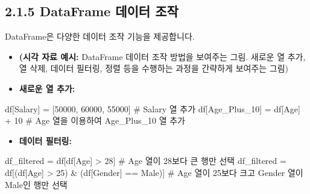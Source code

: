 \documentclass[
  letterpaper,
]{book}
\newenvironment{Shaded}{\begin{snugshade}}{\end{snugshade}}
\newcommand{\CommentTok}[1]{\textcolor[rgb]{0.37,0.37,0.37}{#1}}
\newcommand{\DecValTok}[1]{\textcolor[rgb]{0.68,0.00,0.00}{#1}}
\newcommand{\NormalTok}[1]{\textcolor[rgb]{0.00,0.23,0.31}{#1}}
\newcommand{\OperatorTok}[1]{\textcolor[rgb]{0.37,0.37,0.37}{#1}}
\newcommand{\StringTok}[1]{\textcolor[rgb]{0.13,0.47,0.30}{#1}}
\providecommand{\tightlist}{%
  \setlength{\itemsep}{0pt}\setlength{\parskip}{0pt}}
\begin{document}
\subsection{2.1.5 DataFrame 데이터
조작}\label{dataframe-uxb370uxc774uxd130-uxc870uxc791}

DataFrame은 다양한 데이터 조작 기능을 제공합니다.

\begin{itemize}
\item
  \textbf{(시각 자료 예시:} DataFrame 데이터 조작 방법을 보여주는 그림.
  새로운 열 추가, 열 삭제, 데이터 필터링, 정렬 등을 수행하는 과정을
  간략하게 보여주는 그림)
\item
  \textbf{새로운 열 추가:}
\end{itemize}

\begin{Shaded}
\begin{Highlighting}[]
\NormalTok{    df[}\StringTok{\textquotesingle{}Salary\textquotesingle{}}\NormalTok{] }\OperatorTok{=}\NormalTok{ [}\DecValTok{50000}\NormalTok{, }\DecValTok{60000}\NormalTok{, }\DecValTok{55000}\NormalTok{] }\CommentTok{\# \textquotesingle{}Salary\textquotesingle{} 열 추가}
\NormalTok{    df[}\StringTok{\textquotesingle{}Age\_Plus\_10\textquotesingle{}}\NormalTok{] }\OperatorTok{=}\NormalTok{ df[}\StringTok{\textquotesingle{}Age\textquotesingle{}}\NormalTok{] }\OperatorTok{+} \DecValTok{10} \CommentTok{\# \textquotesingle{}Age\textquotesingle{} 열을 이용하여 \textquotesingle{}Age\_Plus\_10\textquotesingle{} 열 추가}
\end{Highlighting}
\end{Shaded}

\begin{itemize}
\tightlist
\item
  \textbf{데이터 필터링:}
\end{itemize}

\begin{Shaded}
\begin{Highlighting}[]
\NormalTok{    df\_filtered }\OperatorTok{=}\NormalTok{ df[df[}\StringTok{\textquotesingle{}Age\textquotesingle{}}\NormalTok{] }\OperatorTok{\textgreater{}} \DecValTok{28}\NormalTok{] }\CommentTok{\# \textquotesingle{}Age\textquotesingle{} 열이 28보다 큰 행만 선택}
\NormalTok{    df\_filtered }\OperatorTok{=}\NormalTok{ df[(df[}\StringTok{\textquotesingle{}Age\textquotesingle{}}\NormalTok{] }\OperatorTok{\textgreater{}} \DecValTok{25}\NormalTok{) }\OperatorTok{\&}\NormalTok{ (df[}\StringTok{\textquotesingle{}Gender\textquotesingle{}}\NormalTok{] }\OperatorTok{==} \StringTok{\textquotesingle{}Male\textquotesingle{}}\NormalTok{)] }\CommentTok{\# \textquotesingle{}Age\textquotesingle{} 열이 25보다 크고 \textquotesingle{}Gender\textquotesingle{} 열이 \textquotesingle{}Male\textquotesingle{}인 행만 선택}
\end{Highlighting}
\end{Shaded}
\end{document}
